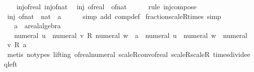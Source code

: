 \begin{isabellebody}
%
\endisadelimproof
%
\isatagproof
{}\isamarkupfalse%
\isanewline
\ \ \isamarkupfalse%
\ inj{\isacharunderscore}{\kern0pt}of{\isacharunderscore}{\kern0pt}real\ inj{\isacharunderscore}{\kern0pt}of{\isacharunderscore}{\kern0pt}nat\ \isamarkupfalse%
\ {\isachardoublequoteopen}inj\ {\isacharparenleft}{\kern0pt}of{\isacharunderscore}{\kern0pt}real\ {\isasymcirc}\ of{\isacharunderscore}{\kern0pt}nat{\isacharparenright}{\kern0pt}{\isachardoublequoteclose}\isanewline
\ \ \ \ \isamarkupfalse%
\ {\isacharparenleft}{\kern0pt}rule\ inj{\isacharunderscore}{\kern0pt}compose{\isacharparenright}{\kern0pt}\isanewline
\ \ \isamarkupfalse%
\ \isamarkupfalse%
\ {\isachardoublequoteopen}inj\ {\isacharparenleft}{\kern0pt}of{\isacharunderscore}{\kern0pt}nat\ {\isacharcolon}{\kern0pt}{\isacharcolon}{\kern0pt}\ nat\ {\isasymRightarrow}\ {\isacharprime}{\kern0pt}a{\isacharparenright}{\kern0pt}{\isachardoublequoteclose}\isanewline
\ \ \ \ \isamarkupfalse%
\ {\isacharparenleft}{\kern0pt}simp\ add{\isacharcolon}{\kern0pt}\ comp{\isacharunderscore}{\kern0pt}def{\isacharparenright}{\kern0pt}\isanewline
{}\isamarkupfalse%
%
\endisatagproof
{\isafoldproof}%
%
\isadelimproof
\isanewline
%
\endisadelimproof
\isanewline
{}\isamarkupfalse%
\ fraction{\isacharunderscore}{\kern0pt}scaleR{\isacharunderscore}{\kern0pt}times\ {\isacharbrackleft}{\kern0pt}simp{\isacharbrackright}{\kern0pt}{\isacharcolon}{\kern0pt}\isanewline
\ \ \ a\ {\isacharcolon}{\kern0pt}{\isacharcolon}{\kern0pt}\ {\isachardoublequoteopen}{\isacharprime}{\kern0pt}a{\isacharcolon}{\kern0pt}{\isacharcolon}{\kern0pt}real{\isacharunderscore}{\kern0pt}algebra{\isacharunderscore}{\kern0pt}{}{\isachardoublequoteclose}\isanewline
\ \ \ {\isachardoublequoteopen}{\isacharparenleft}{\kern0pt}numeral\ u\ {\isacharslash}{\kern0pt}\ numeral\ v{\isacharparenright}{\kern0pt}\ {\isacharasterisk}{\kern0pt}\isactrlsub R\ {\isacharparenleft}{\kern0pt}numeral\ w\ {\isacharasterisk}{\kern0pt}\ a{\isacharparenright}{\kern0pt}\ {\isacharequal}{\kern0pt}\ {\isacharparenleft}{\kern0pt}numeral\ u\ {\isacharasterisk}{\kern0pt}\ numeral\ w\ {\isacharslash}{\kern0pt}\ numeral\ v{\isacharparenright}{\kern0pt}\ {\isacharasterisk}{\kern0pt}\isactrlsub R\ a{\isachardoublequoteclose}\isanewline
%
\isadelimproof
%
\endisadelimproof
%
\isatagproof
{}\isamarkupfalse%
\ {\isacharparenleft}{\kern0pt}metis\ {\isacharparenleft}{\kern0pt}no{\isacharunderscore}{\kern0pt}types{\isacharcomma}{\kern0pt}\ lifting{\isacharparenright}{\kern0pt}\ of{\isacharunderscore}{\kern0pt}real{\isacharunderscore}{\kern0pt}numeral\ scaleR{\isacharunderscore}{\kern0pt}conv{\isacharunderscore}{\kern0pt}of{\isacharunderscore}{\kern0pt}real\ scaleR{\isacharunderscore}{\kern0pt}scaleR\ times{\isacharunderscore}{\kern0pt}divide{\isacharunderscore}{\kern0pt}eq{\isacharunderscore}{\kern0pt}left{\isacharparenright}{\kern0pt}%

\end{isabellebody}
